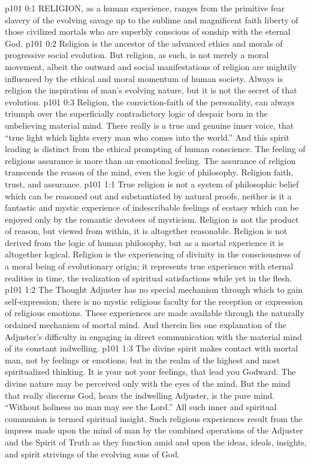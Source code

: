 \vs p101 0:1 RELIGION, as a human experience, ranges from the primitive fear slavery of the evolving savage up to the sublime and magnificent faith liberty of those civilized mortals who are superbly conscious of sonship with the eternal God.
\vs p101 0:2 Religion is the ancestor of the advanced ethics and morals of progressive social evolution. But religion, as such, is not merely a moral movement, albeit the outward and social manifestations of religion are mightily influenced by the ethical and moral momentum of human society. Always is religion the inspiration of man’s evolving nature, but it is not the secret of that evolution.
\vs p101 0:3 Religion, the conviction\hyp{}faith of the personality, can always triumph over the superficially contradictory logic of despair born in the unbelieving material mind. There really is a true and genuine inner voice, that “true light which lights every man who comes into the world.” And this spirit leading is distinct from the ethical prompting of human conscience. The feeling of religious assurance is more than an emotional feeling. The assurance of religion transcends the reason of the mind, even the logic of philosophy. Religion  faith, trust, and assurance.
\vs p101 1:1 True religion is not a system of philosophic belief which can be reasoned out and substantiated by natural proofs, neither is it a fantastic and mystic experience of indescribable feelings of ecstasy which can be enjoyed only by the romantic devotees of mysticism. Religion is not the product of reason, but viewed from within, it is altogether reasonable. Religion is not derived from the logic of human philosophy, but as a mortal experience it is altogether logical. Religion is the experiencing of divinity in the consciousness of a moral being of evolutionary origin; it represents true experience with eternal realities in time, the realization of spiritual satisfactions while yet in the flesh.
\vs p101 1:2 \pc The Thought Adjuster has no special mechanism through which to gain self\hyp{}expression; there is no mystic religious faculty for the reception or expression of religious emotions. These experiences are made available through the naturally ordained mechanism of mortal mind. And therein lies one explanation of the Adjuster’s difficulty in engaging in direct communication with the material mind of its constant indwelling.
\vs p101 1:3 The divine spirit makes contact with mortal man, not by feelings or emotions, but in the realm of the highest and most spiritualized thinking. It is your  not your feelings, that lead you Godward. The divine nature may be perceived only with the eyes of the mind. But the mind that really discerns God, hears the indwelling Adjuster, is the pure mind. “Without holiness no man may see the Lord.” All such inner and spiritual communion is termed spiritual insight. Such religious experiences result from the impress made upon the mind of man by the combined operations of the Adjuster and the Spirit of Truth as they function amid and upon the ideas, ideals, insights, and spirit strivings of the evolving sons of God.

